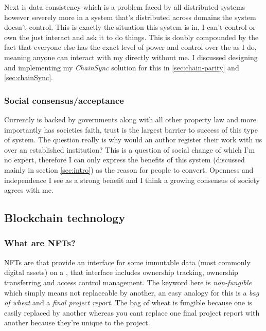 Next is data consistency which is a problem faced by all distributed systems however severely more in a system that's distributed across domains the system doesn't control. This is exactly the situation this system is in, I can't control or own the  just interact and ask it to do things. This is doubly compounded by the fact that everyone else has the exact level of power and control over the  as I do, meaning anyone can interact with my  directly without me. I discussed designing and implementing my \textit{ChainSync} solution for this in \ref{sec:chain-parity} and \ref{sec:chainSync}. %

\subsubsection{Social consensus/acceptance}

Currently  is backed by governments along with all other property law and more importantly has societies faith, trust is the largest barrier to success of this type of system. The question really is why would an author register their work with us over an established institution? This is a question of social change of which I'm no expert, therefore I can only express the benefits of this system (discussed mainly in section \ref{sec:intro}) as the reason for people to convert. Openness and independence I see as a strong benefit and I think a growing consensus of society agrees with me.  

\subsection{Blockchain technology}

\subsubsection{What are NFTs?}

NFTs are  that provide an interface for some immutable data (most commonly digital assets) on a , that interface includes ownership tracking, ownership transferring and access control management. The keyword here is \textit{non-fungible} which simply means not replaceable by another, an easy analogy for this is a \textit{bag of wheat} and a \textit{final project report}. The bag of wheat is fungible because one is easily replaced by another whereas you cant replace one final project report with another because they're unique to the project.

